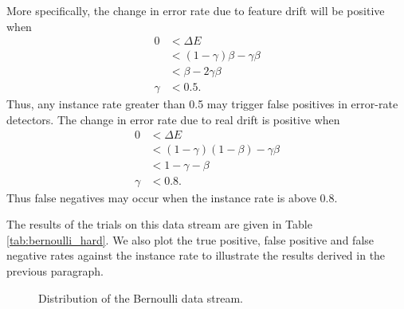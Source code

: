 More specifically, the change in error rate due to feature drift will be positive when
\begin{align}
  0 &< \Delta E \\
  &< (1-\gamma)\beta - \gamma \beta \\
  &< \beta-2\gamma\beta \\
  \gamma &< 0.5.
\end{align}
Thus, any instance rate greater than 0.5 may trigger false positives in error-rate detectors. The change in error rate due to real drift is positive when
\begin{align}
  0 &< \Delta E \\
  &< (1-\gamma)(1-\beta) - \gamma\beta \\
  &< 1 - \gamma - \beta \\
  \gamma &< 0.8.
\end{align}
Thus false negatives may occur when the instance rate is above 0.8.

The results of the trials on this data stream are given in Table \ref{tab:bernoulli_hard}. We also plot the true positive, false positive and false negative rates against the instance rate to illustrate the results derived in the previous paragraph. 

\begin{figure}
    \centering
    \caption{Distribution of the Bernoulli data stream.}
    \label{fig:bernoulli}
\end{figure}

